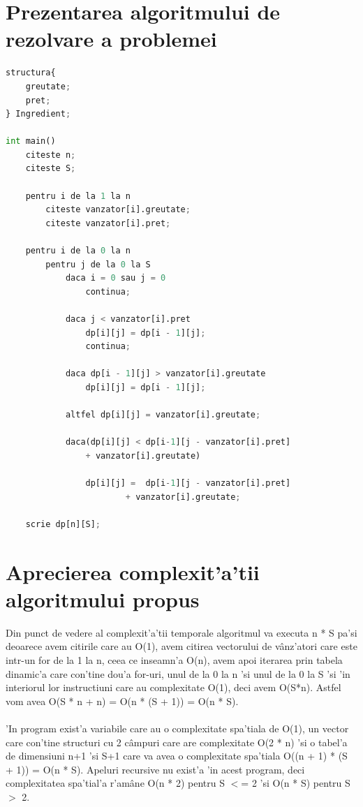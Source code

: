 \section{Prezentarea algoritmului de rezolvare a problemei}
\begin{lstlisting}[language=Python]
structura{
	greutate;
	pret;
} Ingredient;

int main()
	citeste n;
	citeste S;

	pentru i de la 1 la n
		citeste vanzator[i].greutate;
		citeste vanzator[i].pret;

	pentru i de la 0 la n
		pentru j de la 0 la S
			daca i = 0 sau j = 0
				continua;

			daca j < vanzator[i].pret
				dp[i][j] = dp[i - 1][j];
				continua;

			daca dp[i - 1][j] > vanzator[i].greutate
				dp[i][j] = dp[i - 1][j];

			altfel dp[i][j] = vanzator[i].greutate;

			daca(dp[i][j] < dp[i-1][j - vanzator[i].pret] 
				+ vanzator[i].greutate)

				dp[i][j] =  dp[i-1][j - vanzator[i].pret]
						+ vanzator[i].greutate;

	scrie dp[n][S];
\end{lstlisting}

\vspace{10mm}
\section{Aprecierea complexit'a'tii algoritmului propus}
\myindent
Din punct de vedere al complexit'a'tii temporale algoritmul va executa n *  S pa'si deoarece avem citirile care au O(1), avem citirea vectorului de v\^anz'atori care este intr-un for de la 1 la n, ceea ce inseamn'a O(n), avem apoi iterarea prin tabela dinamic'a care con'tine dou'a for-uri, unul de la 0 la n 'si unul de la 0 la S 'si 'in interiorul lor instructiuni care au complexitate O(1), deci avem O(S*n). Astfel vom avea O(S * n + n) = O(n * (S + 1)) = O(n * S).\\\\
\myindent
'In program exist'a variabile care au o complexitate spa'tiala de O(1), un vector care con'tine structuri cu 2 c\^ampuri care are complexitate O(2 * n) 'si o tabel'a de dimensiuni n+1 'si S+1 care va avea o complexitate spa'tiala O((n + 1) *  (S + 1)) = O(n * S). Apeluri recursive nu exist'a 'in acest program, deci complexitatea spa'tial'a r'am\^ane O(n * 2) pentru S $<$= 2 'si O(n * S) pentru S $>$ 2.\\


